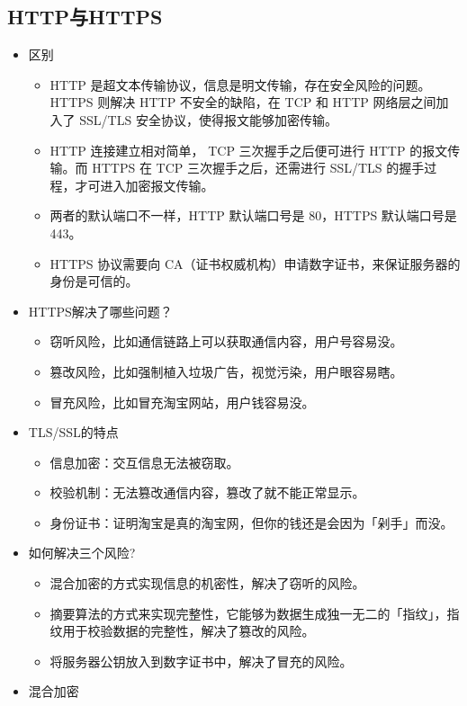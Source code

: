 \documentclass[11pt]{article}
\begin{document}
\subsection{HTTP与HTTPS}
\label{sec:org5ba5202}
\begin{itemize}
\item 区别
\begin{itemize}
\item HTTP 是超文本传输协议，信息是明文传输，存在安全风险的问题。HTTPS 则解决 HTTP 不安全的缺陷，在 TCP 和 HTTP 网络层之间加入了 SSL/TLS 安全协议，使得报文能够加密传输。
\item HTTP 连接建立相对简单， TCP 三次握手之后便可进行 HTTP 的报文传输。而 HTTPS 在 TCP 三次握手之后，还需进行 SSL/TLS 的握手过程，才可进入加密报文传输。
\item 两者的默认端口不一样，HTTP 默认端口号是 80，HTTPS 默认端口号是 443。
\item HTTPS 协议需要向 CA（证书权威机构）申请数字证书，来保证服务器的身份是可信的。
\end{itemize}
\item HTTPS解决了哪些问题？
\begin{itemize}
\item 窃听风险，比如通信链路上可以获取通信内容，用户号容易没。
\item 篡改风险，比如强制植入垃圾广告，视觉污染，用户眼容易瞎。
\item 冒充风险，比如冒充淘宝网站，用户钱容易没。
\end{itemize}
\item TLS/SSL的特点
\begin{itemize}
\item 信息加密：交互信息无法被窃取。
\item 校验机制：无法篡改通信内容，篡改了就不能正常显示。
\item 身份证书：证明淘宝是真的淘宝网，但你的钱还是会因为「剁手」而没。
\end{itemize}
\item 如何解决三个风险?
\begin{itemize}
\item 混合加密的方式实现信息的机密性，解决了窃听的风险。
\item 摘要算法的方式来实现完整性，它能够为数据生成独一无二的「指纹」，指纹用于校验数据的完整性，解决了篡改的风险。
\item 将服务器公钥放入到数字证书中，解决了冒充的风险。
\end{itemize}
\item 混合加密
\begin{itemize}

\end{itemize}
\end{itemize}
\end{document}
